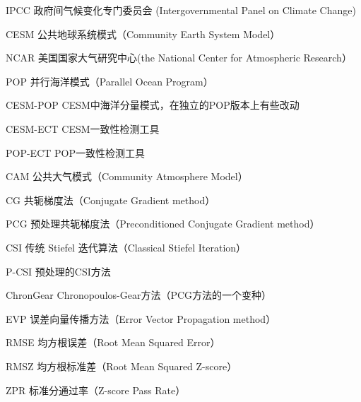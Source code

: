 \begin{denotation}[3cm]
\item[IPCC] 政府间气候变化专门委员会 (Intergovernmental Panel on Climate Change)
\item[CESM]  公共地球系统模式（Community Earth System Model）
\item[NCAR]  美国国家大气研究中心(the National Center for Atmospheric Research）
\item[POP]  并行海洋模式（Parallel Ocean Program）
\item[CESM-POP]  CESM中海洋分量模式，在独立的POP版本上有些改动
\item[CESM-ECT]  CESM一致性检测工具
\item[POP-ECT]  POP一致性检测工具
\item[CAM]  公共大气模式（Community Atmosphere Model）
\item[CG]	共轭梯度法（Conjugate Gradient method）
\item[PCG]  预处理共轭梯度法（Preconditioned Conjugate Gradient method）
\item[CSI]  传统 Stiefel 迭代算法（Classical Stiefel Iteration）
\item[P-CSI]  预处理的CSI方法
\item[ChronGear] Chronopoulos-Gear方法（PCG方法的一个变种）
\item[EVP] 误差向量传播方法（Error Vector Propagation method）
\item[RMSE] 均方根误差（Root Mean Squared Error）
\item[RMSZ] 均方根标准差（Root Mean Squared Z-score）
\item[ZPR] 标准分通过率（Z-score Pass Rate）
\end{denotation}

